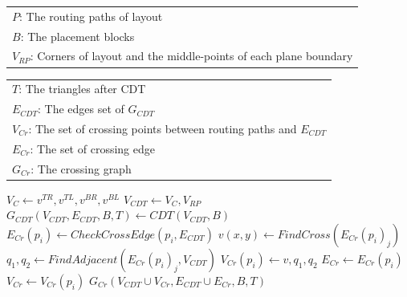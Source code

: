     \newcommand{\CCG}{\ensuremath{\mbox{\sc ConstCrossGraph}}}
    \renewcommand{\algorithmicrequire}{\textbf{Input:}}
    \renewcommand{\algorithmicensure}{\textbf{Output:}}
    \begin{algorithm}[hbt]  
      \caption{$\CCG(P,B,V_{RP})$}\label{alg:CCG}                       
      \begin{scriptsize}
        \begin{algorithmic}[1]
          \REQUIRE 
            \begin{tabular}{l}
              $P$: The routing paths of layout\\
              $B$: The placement blocks \\
              $V_{RP}$: Corners of layout and the middle-points of each plane boundary\\ 
            \end{tabular}
          \ENSURE 
            \begin{tabular}{l}
              $T$: The triangles after CDT\\
              $E_{CDT}$: The edges set of $G_{CDT}$\\
              $V_{Cr}$: The set of crossing points between routing paths and $E_{CDT}$\\
              $E_{Cr}$: The set of crossing edge\\
              $G_{Cr}$: The crossing graph
            \end{tabular}
            \STATE $V_C \gets v^{TR},v^{TL},v^{BR},v^{BL} $ 
          \ENDFOR
          \STATE $V_{CDT}\gets V_C, V_{RP}$  \label{line:VCDT}
          \STATE $G_{CDT}(V_{CDT},E_{CDT},B,T) \gets CDT(V_{CDT},B)$   \label{line:GCDT}
           \label{line:StartCross}
            \STATE $E_{Cr}(p_i) \gets CheckCrossEdge(p_i,E_{CDT})$
              \STATE $v(x,y) \gets FindCross({E_{Cr}(p_i)}_j)$
              \STATE $q_1,q_2 \gets FindAdjacent({E_{Cr}(p_i)}_j,V_{CDT})$
              \STATE $V_{Cr}(p_i) \gets v,q_1,q_2$
            \ENDFOR
            \STATE $E_{Cr} \gets E_{Cr}(p_i)$
            \STATE $V_{Cr} \gets V_{Cr}(p_i)$
          \ENDFOR \label{line:EndCross}
          \RETURN $G_{Cr}(V_{CDT}\cup V_{Cr}, E_{CDT} \cup E_{Cr},B,T)$  
        \end{algorithmic}
      \end{scriptsize} 
    \end{algorithm}

